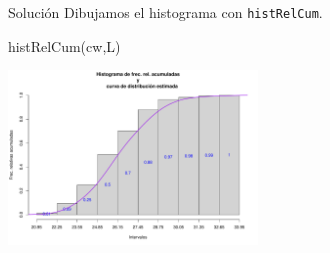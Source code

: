\documentclass[
  ignorenonframetext,
  aspectratio=169]{beamer}
\newenvironment{Shaded}{\begin{snugshade}}{\end{snugshade}}
\newcommand{\FunctionTok}[1]{\textcolor[rgb]{0.00,0.00,0.00}{#1}}
\newcommand{\NormalTok}[1]{#1}
\begin{document}
\begin{frame}[fragile]{Solución}
\protect\hypertarget{soluciuxf3n-48}{}
Dibujamos el histograma con \texttt{histRelCum}.

\begin{Shaded}
\begin{Highlighting}[]
\FunctionTok{histRelCum}\NormalTok{(cw,L)}
\end{Highlighting}
\end{Shaded}

\begin{center}\includegraphics[width=250px]{Hora6_files/figure-beamer/unnamed-chunk-66-1} \end{center}
\end{frame}
\end{document}
